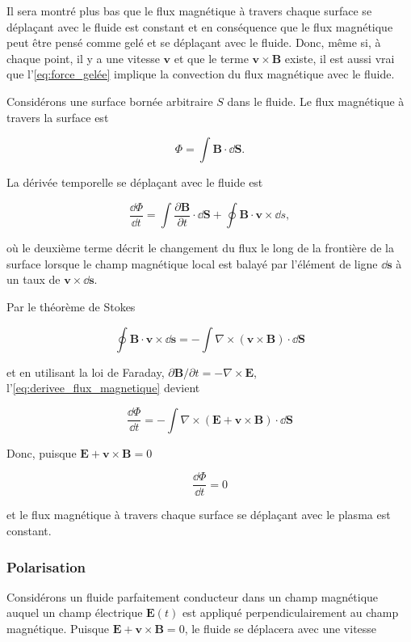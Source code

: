 \documentclass[main.tex]{subfiles}
\begin{document}
\noindent Il sera montré plus bas que le flux magnétique à travers chaque surface se déplaçant avec le fluide est constant et en conséquence que le flux magnétique peut être pensé comme gelé et se déplaçant avec le fluide.
Donc, même si, à chaque point, il y a une vitesse \( \bm{v} \) et que le terme \( \bm{v} \times \bm{B} \) existe, il est aussi vrai que l'\autoref{eq:force_gelée} implique la convection du flux magnétique avec le fluide.

Considérons une surface bornée arbitraire \( S \) dans le fluide. 
Le flux magnétique à travers la surface est

\[
	\Phi = \int \bm{B} \cdot \dd \bm{S}.
\]

La dérivée temporelle se déplaçant avec le fluide est

\begin{equation}
	\frac{\dd \Phi}{\dd t} = \int \frac{\partial \bm{B}}{\partial t} \cdot \dd \bm{S} + \oint \bm{B} \cdot \bm{v} \times \dd s,
	\label{eq:derivee_flux_magnetique}
\end{equation}

\noindent où le deuxième terme décrit le changement du flux le long de la frontière de la surface lorsque le champ magnétique local est balayé par l'élément de ligne \( \dd \bm{s} \) à un taux de \( \bm{v} \times \dd\bm{s} \).

Par le théorème de Stokes

\[
	\oint \bm{B} \cdot \bm{v} \times \dd \bm{s} = - \int \nabla \times \left( \bm{v} \times \bm{B} \right) \cdot \dd \bm{S}
\]

\noindent et en utilisant la loi de Faraday, \( \partial \bm{B}  / \partial t = - \nabla \times \bm{E} \), l'\autoref{eq:derivee_flux_magnetique} devient

\[
	\frac{\dd \Phi}{\dd t} = - \int \nabla \times \left( \bm{E} + \bm{v} \times \bm{B} \right) \cdot \dd \bm{S}
\]

\noindent Donc, puisque \( \bm{E} + \bm{v} \times \bm{B} = 0 \)

\[
	\frac{\dd \Phi}{\dd t} = 0
\]

\noindent et le flux magnétique à travers chaque surface se déplaçant avec le plasma est constant.

\subsubsection*{Polarisation}

Considérons un fluide parfaitement conducteur dans un champ magnétique auquel un champ électrique \( \bm{E} \left( t \right) \) est appliqué perpendiculairement au champ magnétique. Puisque \( \bm{E} + \bm{v} \times \bm{B} = 0 \), le fluide se déplacera avec une vitesse
\end{document}
